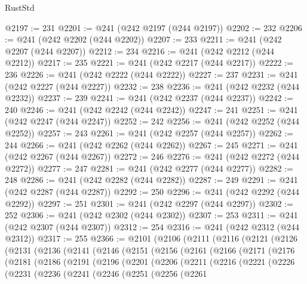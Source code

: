 \begin{lexlean}{RustStd}
\begin{coremodule}
@2197 := 231
@2201 := @241 (@242 @2197 (@244 @2197))
@2202 := 232
@2206 := @241 (@242 @2202 (@244 @2202))
@2207 := 233
@2211 := @241 (@242 @2207 (@244 @2207))
@2212 := 234
@2216 := @241 (@242 @2212 (@244 @2212))
@2217 := 235
@2221 := @241 (@242 @2217 (@244 @2217))
@2222 := 236
@2226 := @241 (@242 @2222 (@244 @2222))
@2227 := 237
@2231 := @241 (@242 @2227 (@244 @2227))
@2232 := 238
@2236 := @241 (@242 @2232 (@244 @2232))
@2237 := 239
@2241 := @241 (@242 @2237 (@244 @2237))
@2242 := 240
@2246 := @241 (@242 @2242 (@244 @2242))
@2247 := 241
@2251 := @241 (@242 @2247 (@244 @2247))
@2252 := 242
@2256 := @241 (@242 @2252 (@244 @2252))
@2257 := 243
@2261 := @241 (@242 @2257 (@244 @2257))
@2262 := 244
@2266 := @241 (@242 @2262 (@244 @2262))
@2267 := 245
@2271 := @241 (@242 @2267 (@244 @2267))
@2272 := 246
@2276 := @241 (@242 @2272 (@244 @2272))
@2277 := 247
@2281 := @241 (@242 @2277 (@244 @2277))
@2282 := 248
@2286 := @241 (@242 @2282 (@244 @2282))
@2287 := 249
@2291 := @241 (@242 @2287 (@244 @2287))
@2292 := 250
@2296 := @241 (@242 @2292 (@244 @2292))
@2297 := 251
@2301 := @241 (@242 @2297 (@244 @2297))
@2302 := 252
@2306 := @241 (@242 @2302 (@244 @2302))
@2307 := 253
@2311 := @241 (@242 @2307 (@244 @2307))
@2312 := 254
@2316 := @241 (@242 @2312 (@244 @2312))
@2317 := 255
@2366 := @2101
    (@2106
      (@2111
        (@2116
          (@2121
            (@2126
              (@2131
                (@2136
                  (@2141
                    (@2146
                      (@2151
                        (@2156
                          (@2161
                            (@2166
                              (@2171
                                (@2176
                                  (@2181
                                    (@2186
                                      (@2191
                                        (@2196
                                          (@2201
                                            (@2206
                                              (@2211
                                                (@2216
                                                  (@2221
                                                    (@2226
                                                      (@2231
                                                        (@2236
                                                          (@2241
                                                            (@2246
                                                              (@2251
                                                                (@2256
                                                                  (@2261

\end{coremodule}
\end{lexlean}
